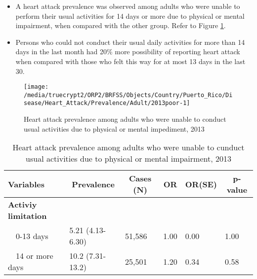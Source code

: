  \newpage
\begin{itemize}

\item A  
heart attack prevalence was observed among adults who were unable to perform their usual activities for 14 days or more due to physical or mental impairment, when compared with the other group. Refer to Figure \ref{fig:poor.Heart_Attack.2013}.



\item Persons who could not conduct their usual daily activities for more than 14 days in the last month had 20\% more possibility of reporting heart attack when compared with those who felt this way for at most 13 days in the last 30.

\end{itemize}

\begin{figure}[H]
\caption{Heart attack prevalence among adults who were unable to conduct usual activities due to physical or mental impediment, 2013}
\label{fig:poor.Heart_Attack.2013}

\begin{knitrout}
\color{fgcolor}

{\centering \texttt{[image: /media/truecrypt2/ORP2/BRFSS/Objects/Country/Puerto\_Rico/Disease/Heart\_Attack/Prevalence/Adult/2013poor-1]} 

}



\end{knitrout}
\end{figure}

\begin{table}[H]
\caption{Heart attack prevalence among adults who were unable to cunduct usual activities due to physical or mental impairment, 2013\label{tab:poor.Heart_Attack.2013}} 
\begin{center}
\begin{tabular}{llllll}
\hline\hline
\multicolumn{1}{l}{Variables}&\multicolumn{1}{c}{Prevalence}&\multicolumn{1}{c}{Cases (N)}&\multicolumn{1}{c}{OR}&\multicolumn{1}{c}{OR(SE)}&\multicolumn{1}{c}{p-value}\tabularnewline
\hline
{\bfseries Activiy limitation}&&&&&\tabularnewline
~~0-13 days&5.21 (4.13-6.30)&51,586&1.00&0.00&1.00\tabularnewline
~~14 or more days&10.2 (7.31-13.2)&25,501&1.20&0.34&0.58\tabularnewline
\hline
\end{tabular}\end{center}

\end{table}


